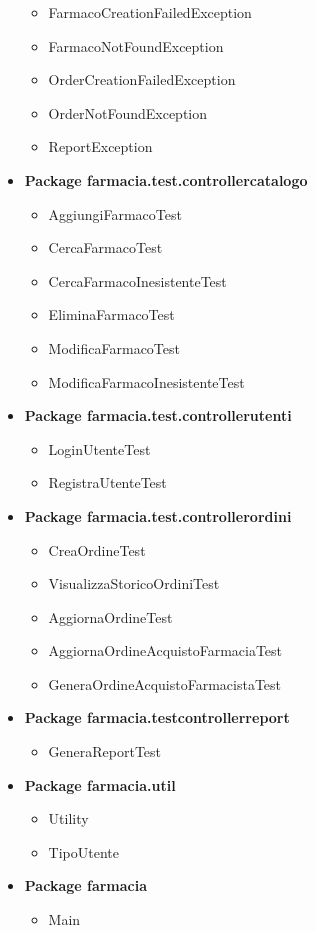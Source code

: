 \begin{itemize}
\begin{itemize}
		\item FarmacoCreationFailedException
		\item FarmacoNotFoundException
		\item OrderCreationFailedException
		\item OrderNotFoundException
		\item ReportException
	\end{itemize}
	\item \textbf{Package farmacia.test.controllercatalogo}
	\begin{itemize}
		\item AggiungiFarmacoTest
		\item CercaFarmacoTest
		\item CercaFarmacoInesistenteTest
		\item EliminaFarmacoTest
		\item ModificaFarmacoTest
		\item ModificaFarmacoInesistenteTest
	\end{itemize}
	\item \textbf{Package farmacia.test.controllerutenti}
	\begin{itemize}
		\item LoginUtenteTest
		\item RegistraUtenteTest
	\end{itemize}
	\item \textbf{Package farmacia.test.controllerordini}
	\begin{itemize}
		\item CreaOrdineTest
		\item VisualizzaStoricoOrdiniTest
		\item AggiornaOrdineTest
		\item AggiornaOrdineAcquistoFarmaciaTest
		\item GeneraOrdineAcquistoFarmacistaTest
	\end{itemize}
	\item \textbf{Package farmacia.testcontrollerreport}
	\begin{itemize}
		\item GeneraReportTest
	\end{itemize}
	\item \textbf{Package farmacia.util}
	\begin{itemize}
		\item Utility
		\item TipoUtente
	\end{itemize}
	\item \textbf{Package farmacia}
	\begin{itemize}
		\item Main
	\end{itemize}
\end{itemize}
